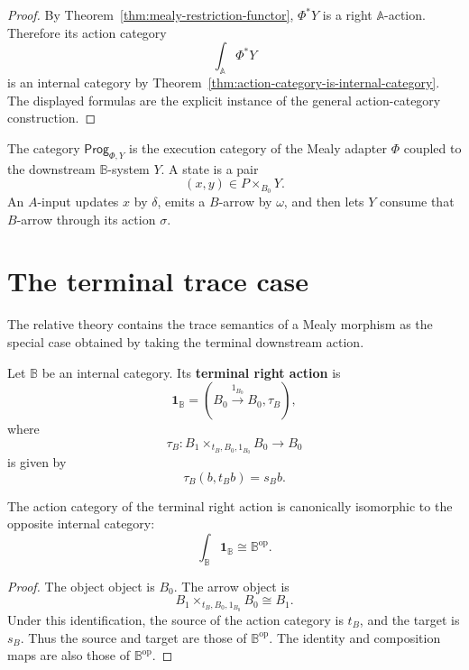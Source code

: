 \begin{proof}
By Theorem~\ref{thm:mealy-restriction-functor}, \(\Phi^\ast Y\) is a right
\(\mathbb A\)-action. Therefore its action category
\[
\int_{\mathbb A}\Phi^\ast Y
\]
is an internal category by
Theorem~\ref{thm:action-category-is-internal-category}. The displayed formulas
are the explicit instance of the general action-category construction.
\end{proof}

\begin{remark}
\label{rem:relative-program-category-interpretation}
The category \(\mathsf{Prog}_{\Phi,Y}\) is the execution category of the
Mealy adapter \(\Phi\) coupled to the downstream \(\mathbb B\)-system \(Y\).
A state is a pair
\[
(x,y)\in P\times_{B_0}Y.
\]
An \(A\)-input updates \(x\) by \(\delta\), emits a \(B\)-arrow by \(\omega\),
and then lets \(Y\) consume that \(B\)-arrow through its action \(\sigma\).
\end{remark}

\section{The terminal trace case}
\label{sec:terminal-trace-case}

The relative theory contains the trace semantics of a Mealy morphism as the
special case obtained by taking the terminal downstream action.

\begin{definition}
\label{def:terminal-right-action}
Let \(\mathbb B\) be an internal category. Its \textbf{terminal right action}
is
\[
\mathbf 1_{\mathbb B}
=
(B_0\xrightarrow{1_{B_0}}B_0,\tau_B),
\]
where
\[
\tau_B:
B_1\times_{t_B,B_0,1_{B_0}}B_0\to B_0
\]
is given by
\[
\tau_B(b,t_Bb)=s_Bb.
\]
\end{definition}

\begin{proposition}
\label{prop:terminal-action-category}
The action category of the terminal right action is canonically isomorphic to
the opposite internal category:
\[
\int_{\mathbb B}\mathbf 1_{\mathbb B}
\cong
\mathbb B^{\mathrm{op}}.
\]
\end{proposition}

\begin{proof}
The object object is \(B_0\). The arrow object is
\[
B_1\times_{t_B,B_0,1_{B_0}}B_0\cong B_1.
\]
Under this identification, the source of the action category is \(t_B\), and
the target is \(s_B\). Thus the source and target are those of
\(\mathbb B^{\mathrm{op}}\). The identity and composition maps are also those
of \(\mathbb B^{\mathrm{op}}\).
\end{proof}

